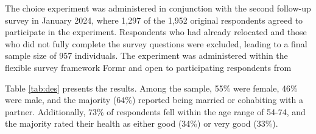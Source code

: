 \documentclass[3p,11pt ]{elsarticle}
\begin{document}




The choice experiment was administered in conjunction with the second follow-up survey in January 2024,
where 1,297 of the 1,952 original respondents agreed to participate in the experiment.
Respondents who had already relocated and those who did not fully complete the survey questions were excluded, leading to a final sample size of 957 individuals.
The experiment was administered within the flexible survey framework Formr and open to participating respondents from 

Table \ref{tab:des} presents the results.
Among the sample, 55\% were female, 46\% were male, and the majority (64\%) reported being married or cohabiting with a partner. Additionally, 73\% of respondents fell within the age range of 54-74, and the majority rated their health as either good (34\%) or very good (33\%).

\begin{table}




\end{table}

\clearpage

%
%
%
\end{document}
